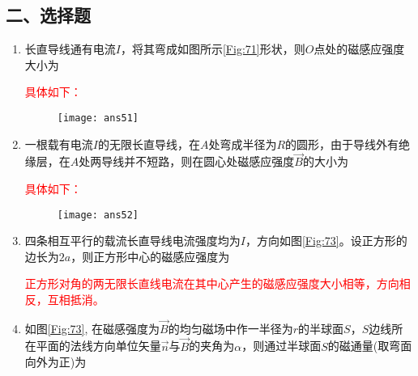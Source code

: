 \subsection*{二、选择题}
\begin{enumerate}
    \item 长直导线通有电流$I$，将其弯成如图所示\ref{Fig:71}形状，则$O$点处的磁感应强度大小为~
    \begin{note}
        \textcolor{red}{具体如下：}
        \begin{figure}[H]
            \centering
            \texttt{[image: ans51]}
        \end{figure}
    \end{note}
    \item 一根载有电流$I$的无限长直导线，在$A$处弯成半径为$R$的圆形，由于导线外有绝缘层，在$A$处两导线并不短路，则在圆心处磁感应强度$\vec{B}$的大小为~
    \begin{note}
        \textcolor{red}{具体如下：}
        \begin{figure}[H]
            \centering
            \texttt{[image: ans52]}
        \end{figure}
    \end{note}
    \item 四条相互平行的载流长直导线电流强度均为$I$，方向如图\ref{Fig:73}。设正方形的边长为$2a$，则正方形中心的磁感应强度为~
    \begin{note}
        \textcolor{red}{正方形对角的两无限长直线电流在其中心产生的磁感应强度大小相等，方向相反，互相抵消。}
    \end{note}
    \item 如图\ref{Fig:73}, 在磁感强度为$\vec{B}$的均匀磁场中作一半径为$r$的半球面$S$，$S$边线所在平面的法线方向单位矢量$\vec{n}$与$\vec{B}$的夹角为$\alpha$，则通过半球面$S$的磁通量(取弯面向外为正)为~
    \begin{note}

\end{note}
\end{enumerate}

